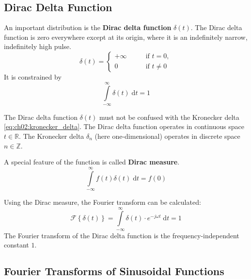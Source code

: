 \begin{refsection}
\subsection{Dirac Delta Function} \label{sec:ch02_dirac_impulse}

An important distribution is the  \textbf{Dirac delta function} $\delta(t)$. The Dirac delta function is zero everywhere except at its origin, where it is an indefinitely narrow, indefinitely high pulse.
\begin{equation}
	\delta(t) = \begin{cases}
		+\infty & \qquad \text{if } t = 0, \\
		0 & \qquad \text{if } t \neq 0
	\end{cases}
	\label{eq:ch02:dirac_delta}
\end{equation}
It is constrained by
\begin{equation}
	\int\limits_{-\infty}^{\infty} \delta(t) \; \mathrm{d} t = 1
\end{equation}

\begin{attention}
	The Dirac delta function $\delta(t)$ must not be confused with the Kronecker delta \eqref{eq:ch02:kronecker_delta}. The Dirac delta function operates in continuous space $t \in \mathbb{R}$. The Kronecker delta $\delta_n$ (here one-dimensional) operates in discrete space $n \in \mathbb{Z}$.
\end{attention}

A special feature of the function is called  \textbf{Dirac measure}.
\begin{equation}
	\int\limits_{-\infty}^{\infty} f(t) \delta(t) \; \mathrm{d} t = f(0)
	\label{eq:ch02:dirac_measure}
\end{equation}

Using the Dirac measure, the Fourier transform can be calculated:
\begin{equation}
	\mathcal{F} \left\{\delta(t)\right\} = \int\limits_{-\infty}^{\infty} \delta(t) \cdot e^{-j \omega t} \; \mathrm{d} t = 1
	\label{eq:ch02:ft_dirac}
\end{equation}
The Fourier transform of the Dirac delta function is the frequency-independent constant $1$.

\subsection{Fourier Transforms of Sinusoidal Functions}


\end{refsection}
